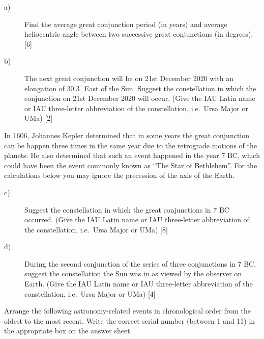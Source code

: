 \begin{description}
\item[a)] Find the average great conjunction period (in years) and average
  heliocentric angle between two successive great conjunctions (in degrees).
  \hfill[6]
\item[b)] The next great conjunction will be on 21st December 2020 with an
  elongation of $30.3^\circ$ East of the Sun. Suggest the constellation in
  which the conjunction on 21st December 2020 will occur. (Give the IAU Latin
  name or IAU three-letter abbreviation of the constellation, i.e.\ Ursa Major
  or UMa) \hfill[2]
\end{description}

In 1606, Johannes Kepler determined that in some years the great conjunction
can be happen three times in the same year due to the retrograde motions of
the planets. He also determined that such an event happened in the year 7 BC,
which could have been the event commonly known as ``The Star of Bethlehem''.
For the calculations below you may ignore the precession of the axis of the
Earth.

\begin{description}
\item[c)] Suggest the constellation in which the great conjunctions in 7 BC
  occurred. (Give the IAU Latin name or IAU three-letter abbreviation of the
  constellation, i.e.\ Ursa Major or UMa) \hfill[8]
\item[d)] During the second conjunction of the series of three conjunctions
  in 7 BC, suggest the constellation the Sun was in as viewed by the observer
  on Earth. (Give the IAU Latin name or IAU three-letter abbreviation of the
  constellation, i.e.\ Ursa Major or UMa) \hfill[4]
\end{description}

Arrange the following astronomy-related events in chronological order from the
oldest to the most recent. Write the correct serial number (between 1 and 11)
in the appropriate box on the answer sheet.

